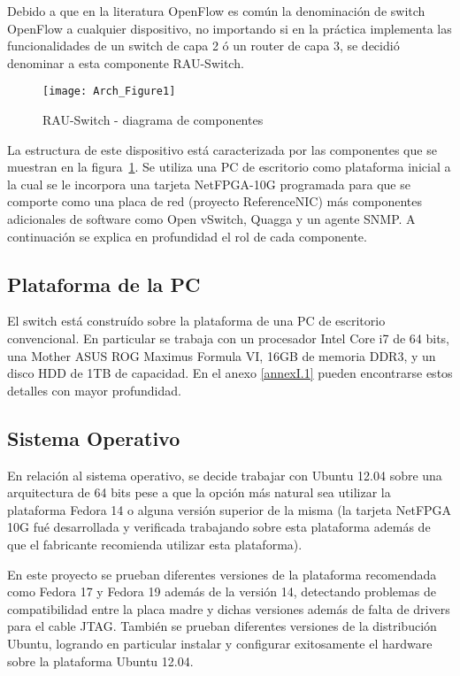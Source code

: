 Debido a que en la literatura OpenFlow es común la denominación de switch OpenFlow a cualquier dispositivo, no importando si en la pr\'actica implementa las funcionalidades de un switch de capa 2 \'o un router de capa 3, se decidió denominar a esta componente RAU-Switch.\\

\begin{figure}[h] 
\centering    
\texttt{[image: Arch\_Figure1]}
\caption[RAU-Switch - diagrama de componentes]{RAU-Switch - diagrama de componentes}
\label{fig:OpenSourceRArch}
\end{figure}

La estructura de este dispositivo est\'a caracterizada por las componentes que se muestran en la figura~\ref{fig:OpenSourceRArch}. Se utiliza una PC de escritorio como plataforma inicial a la cual se le incorpora una tarjeta NetFPGA-10G programada para que se comporte como una placa de red (proyecto ReferenceNIC) m\'as componentes adicionales de software como Open vSwitch, Quagga y un agente SNMP. A continuaci\'on se explica en profundidad el rol de cada componente.

\subsection{Plataforma de la PC}
El switch est\'a constru\'ido sobre la plataforma de una PC de escritorio convencional. En particular se trabaja con un procesador Intel Core i7 de 64 bits, una Mother ASUS ROG Maximus Formula VI, 16GB de memoria DDR3, y un disco HDD de 1TB de capacidad. En el anexo \ref{annexI.1} pueden encontrarse estos detalles con mayor profundidad.

\subsection{Sistema Operativo}
En relación al sistema operativo, se decide trabajar con Ubuntu 12.04 sobre una arquitectura de 64 bits pese a que la opci\'on m\'as natural sea utilizar la plataforma Fedora 14 o alguna versi\'on superior de la misma (la tarjeta NetFPGA 10G fu\'e desarrollada y verificada trabajando sobre esta plataforma adem\'as de que el fabricante recomienda utilizar esta plataforma).

En este proyecto se prueban diferentes versiones de la plataforma recomendada como Fedora 17 y Fedora 19 adem\'as de la versi\'on 14, detectando problemas de compatibilidad entre la placa madre y dichas versiones adem\'as de falta de drivers para el cable JTAG. Tambi\'en se prueban diferentes versiones de la distribuci\'on Ubuntu, logrando en particular instalar y configurar exitosamente el hardware sobre la plataforma Ubuntu 12.04.

